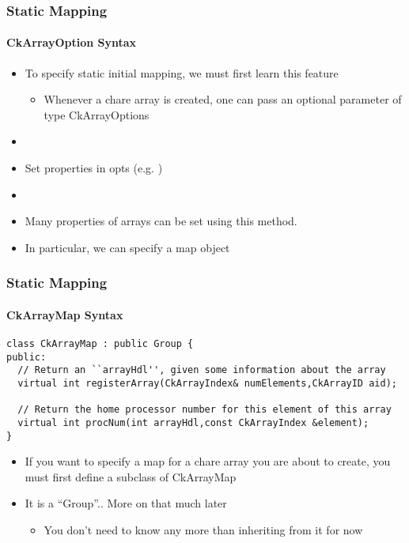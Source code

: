 \begin{frame}[fragile]
  \frametitle{Static Mapping}
  \framesubtitle{CkArrayOption Syntax}
  \begin{itemize}
    \item To specify static initial mapping, we must first learn this feature
    \begin{itemize}
      \item Whenever a chare array is created, one can pass an optional parameter of type CkArrayOptions
    \end{itemize}
    \item {}
    \item Set properties in opts (e.g.  )
    \item {}
    \item Many properties of arrays can be set using this method.
    \item In particular, we can specify a map object
  \end{itemize}
\end{frame}

\begin{frame}[fragile]
  \frametitle{Static Mapping}
  \framesubtitle{CkArrayMap Syntax}
  \begin{lstlisting}
class CkArrayMap : public Group {
public:
  // Return an ``arrayHdl'', given some information about the array
  virtual int registerArray(CkArrayIndex& numElements,CkArrayID aid);

  // Return the home processor number for this element of this array
  virtual int procNum(int arrayHdl,const CkArrayIndex &element);
}
  \end{lstlisting}
  \begin{itemize}
    \item If you want to specify a map for a chare array you are about to create, you must first define a subclass of CkArrayMap
    \item It is a ``Group''.. More on that much later
    \begin{itemize}
      \item You don’t need to know any more than inheriting from it for now
    \end{itemize}
  \end{itemize}
\end{frame}

